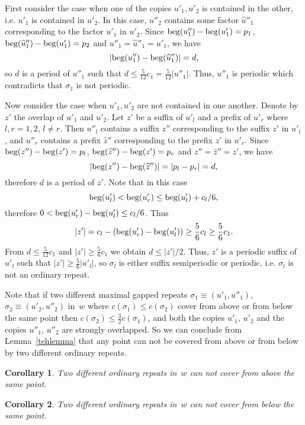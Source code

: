 \documentclass{article}
\newtheorem{corollary}{Corollary}
\begin{document}
First consider the case when one of the copies $u'_1, u'_2$ is contained in
the other, i.e. $u'_1$ is contained in $u'_2$. In this case, $u''_2$
contains some factor $\widehat u''_1$ corresponding to the factor $u'_1$ in
$u'_2$. Since ${\rm beg}(u''_1)-{\rm beg}(u'_1)=p_1$, ${\rm beg}(\widehat
u''_1)-{\rm beg}(u'_1)=p_2$ and $u''_1=\widehat u''_1=u'_1$, we have
$$
|{\rm beg}(u''_1)-{\rm beg}(\widehat u''_1)|=d,
$$
so $d$ is a period of $u''_1$ such that $d\le\frac{5}{12}c_1=\frac{5}{12}|u''_1|$. 
Thus, $u''_1$ is periodic which contradicts that $\sigma_1$ is not periodic.

Now consider the case when $u'_1, u'_2$ are not contained in one another.
Denote by $z'$ the overlap of  $u'_1$ and $u'_2$. Let $z'$ be a suffix of
$u'_l$ and a prefix of $u'_r$ where $l, r=1, 2$, $l\neq r$. Then $u''_l$
contains a suffix $z''$ corresponding to the suffix $z'$ in $u'_l$, and $u''_r$ 
contains a prefix $\widehat z''$ corresponding to the prefix $z'$ in $u'_r$. 
Since ${\rm beg}(z'')-{\rm beg}(z')=p_l$, ${\rm beg}(\widehat z'')-{\rm beg}(z')=p_r$ 
and $z''=\widehat z''=z'$, we have
$$
|{\rm beg}(z'')-{\rm beg}(\widehat z'')|=|p_l-p_r|=d,
$$
therefore $d$ is a period of $z'$. Note that in this case
$$
{\rm beg}(u'_l)<{\rm beg}(u'_r)\le {\rm beg}(u'_l)+c_l/6,
$$
therefore $0<{\rm beg}(u'_r)-{\rm beg}(u'_l)\le c_l/6$. Thus
$$
|z'|=c_l-({\rm beg}(u'_r)-{\rm beg}(u'_l))\ge\frac{5}{6}c_l\ge\frac{5}{6}c_1.
$$
From $d\le\frac{5}{12}c_1$ and $|z'|\ge\frac{5}{6}c_1$ we obtain $d\le |z'|/2$. 
Thus, $z'$ is a periodic suffix of $u'_l$ such that $|z'|\ge \frac{5}{6}|u'_l|$, 
so $\sigma_l$ is either suffix semiperiodic or periodic, i.e. $\sigma_l$ is not 
an ordinary repeat. 

Note that if two different maximal gapped repeats $\sigma_1\equiv (u'_1, u''_1)$, 
$\sigma_2\equiv (u'_2, u''_2)$ in~$w$ where $c(\sigma_1)\le c(\sigma_2)$ cover
from above or from below the same point then $c(\sigma_2)\le\frac{3}{2}c(\sigma_1)$,
and both the copies $u'_1$, $u'_2$ and the copies $u''_1$, $u''_2$ are strongly 
overlapped. So we can conclude from Lemma~\ref{tehlemma} that any point can not be 
covered from above or from below by two different ordinary repeats.

\begin{corollary}
Two different ordinary repeats in~$w$ can not cover from above the same point.
\label{keycorra}
\end{corollary}
\begin{corollary}
Two different ordinary repeats in~$w$ can not cover from below the same point.
\label{keycorrb}
\end{corollary}
\end{document}
